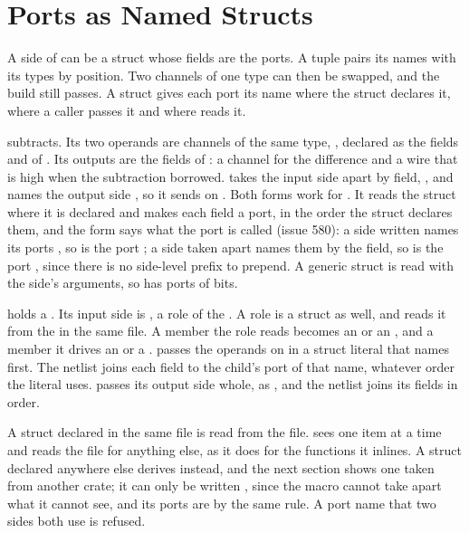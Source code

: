 \section{Ports as Named Structs}
\label{sec:x-ports}

A side of  can be a struct whose fields are the ports.
A tuple pairs its names with its types by position. Two channels of
one type can then be swapped, and the build still passes. A struct
gives each port its name where the struct declares it, where a
caller passes it and where  reads it.

 subtracts. Its two operands are channels of the same
type, , declared as the fields  and
 of . Its outputs are the fields of
: a channel for the difference and a wire that is high
when the subtraction borrowed.  takes the input side apart
by field, , and names the
output side , so it sends on . Both forms
work for \code{\#[lower]}. It reads the struct where it is declared
and makes each field a port, in the order the struct declares them,
and the form says what the port is called (issue 580): a side written
 names its ports , so 
is the port ; a side taken apart names them by the
field, so  is the port , since there is
no side-level prefix to prepend. A generic struct is read with the side's
arguments, so  has ports of  bits.

 holds a . Its input side is , a
role of the  . A role is a struct as
well, and \code{\#[lower]} reads it from the  in the
same file. A member the role reads becomes an  or an
, and a member it drives an  or a . 
passes the operands on in a struct literal that names
 first. The netlist joins each field to the child's
port of that name, whatever order the literal uses.  passes
its output side whole, as , and the netlist joins its
fields in order.

A struct declared in the same file is read from the file.
\code{\#[lower]} sees one item at a time and reads the file for
anything else, as it does for the functions it inlines. A struct
declared anywhere else derives  instead, and the next
section shows one taken from another crate; it can only be written
, since the macro cannot take apart what it cannot
see, and its ports are  by the same rule. A port
name that two sides both use is refused.

